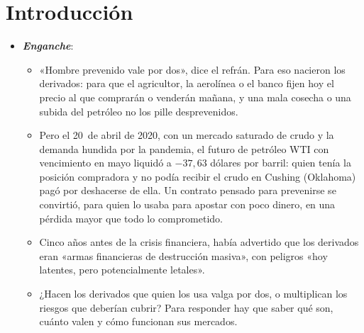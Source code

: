 \documentclass[11pt]{article}
\begin{document}
\tceetitulo

\section*{Introducción}

\begin{itemize}
\item \textbf{\emph{Enganche}}:
  \begin{itemize}
  \item «Hombre prevenido vale por dos», dice el refrán. Para eso nacieron los derivados: para que el agricultor, la aerolínea o el banco fijen hoy el precio al que comprarán o venderán mañana, y una mala cosecha o una subida del petróleo no los pille desprevenidos.
  \item Pero el 20~de abril de 2020, con un mercado saturado de crudo y la demanda hundida por la pandemia, el futuro de petróleo WTI con vencimiento en mayo liquidó a $-37{,}63$ dólares por barril: quien tenía la posición compradora y no podía recibir el crudo en Cushing (Oklahoma) pagó por deshacerse de ella\nocite{CFTC2020WTI,EIA2026WTI}. Un contrato pensado para prevenirse se convirtió, para quien lo usaba para apostar con poco dinero, en una pérdida mayor que todo lo comprometido.
  \item Cinco años antes de la crisis financiera,  había advertido que los derivados eran «armas financieras de destrucción masiva», con peligros «hoy latentes, pero potencialmente letales»\nocite{Buffett2003Carta}.
  \item ¿Hacen los derivados que quien los usa valga por dos, o multiplican los riesgos que deberían cubrir? Para responder hay que saber qué son, cuánto valen y cómo funcionan sus mercados.
  \end{itemize}


\end{itemize}
\end{document}
